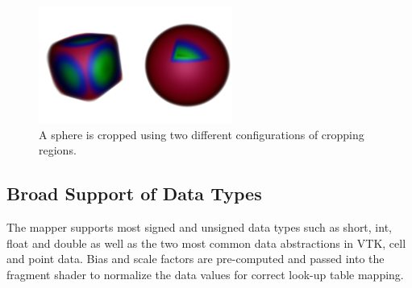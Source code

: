 \begin{figure}[htb]
  \centering
  \includegraphics[width=2.5in]{SphereCropping.png}
  \caption{A sphere is cropped using two different configurations of cropping regions.}
  \label{fig:cropping}
\end{figure}

\subsection{Broad Support of Data Types}
The mapper supports most signed and unsigned data types such as short, int,
float and double as well as the two most common data abstractions in VTK,
cell and point data.  Bias and scale factors are pre-computed and passed into
the fragment shader to normalize the data values for correct look-up table
mapping.

